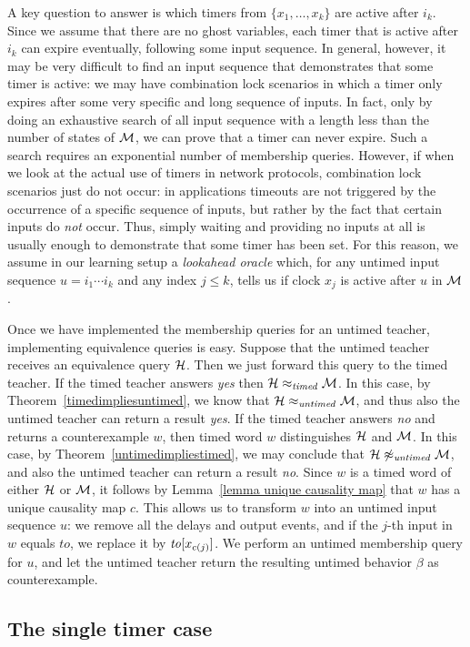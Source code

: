 A key question to answer is which timers from $ \{ x_1 ,\ldots, x_k \}$ are active after $i_k$.
Since we assume that there are no ghost variables, each timer that is active after $i_k$ can expire eventually, following some input sequence.
In general, however, it may be very difficult to find an input sequence that demonstrates that some timer is active: we may have combination lock scenarios
in which a timer only expires after some very specific and long sequence of inputs.
In fact, only by doing an exhaustive search of all input sequence with a length less than the number of states of ${\cal M}$,
we can prove that a timer can never expire. Such a search requires an exponential number of membership queries.
However, if when we look at the actual use of timers in network protocols, combination lock scenarios just do not occur:
in applications timeouts are not triggered by the occurrence of a specific sequence of inputs, but rather by the fact that certain inputs do \emph{not} occur.
Thus,  simply waiting and providing no inputs at all is usually enough to demonstrate that some timer has been set.
For this reason, we assume in our learning setup a \emph{lookahead oracle} which, for any untimed input sequence $u = i_1 \cdots i_k$ and any index $j \leq k$,
tells us if clock $x_j$ is active after $u$ in ${\cal M}$.


Once we have implemented the membership queries for an untimed teacher, implementing equivalence queries is easy.
Suppose that the untimed teacher receives an equivalence query ${\cal H}$.
Then we just forward this query to the timed teacher.
If the timed teacher answers \emph{yes} then ${\cal H} \approx_{\mathit{timed}} {\cal M}$.
In this case, by Theorem~\ref{timedimpliesuntimed}, we know that ${\cal H} \approx_{\mathit{untimed}} {\cal M}$,
and thus also the untimed teacher can return a result \emph{yes}.
If the timed teacher answers \emph{no} and returns a counterexample $w$,
then timed word $w$ distinguishes ${\cal H}$ and ${\cal M}$.
In this case, by Theorem~\ref{untimedimpliestimed}, we may conclude that
${\cal H} \not\approx_{\mathit{untimed}} {\cal M}$, and also the untimed teacher can return a result \emph{no}.
Since $w$ is a timed word of either ${\cal H}$ or ${\cal M}$, it follows by Lemma~\ref{lemma unique causality map}
that $w$ has a unique causality map $c$.
This allows us to transform $w$ into an untimed input sequence $u$: we remove all the delays and output events, and if the $j$-th
input in $w$ equals $\mathit{to}$, we replace it by $\mathit{to}[x_{c(j)}]$.
We perform an untimed membership query for $u$, and let the untimed teacher return the resulting untimed behavior $\beta$ as counterexample.

\subsection{The single timer case}





